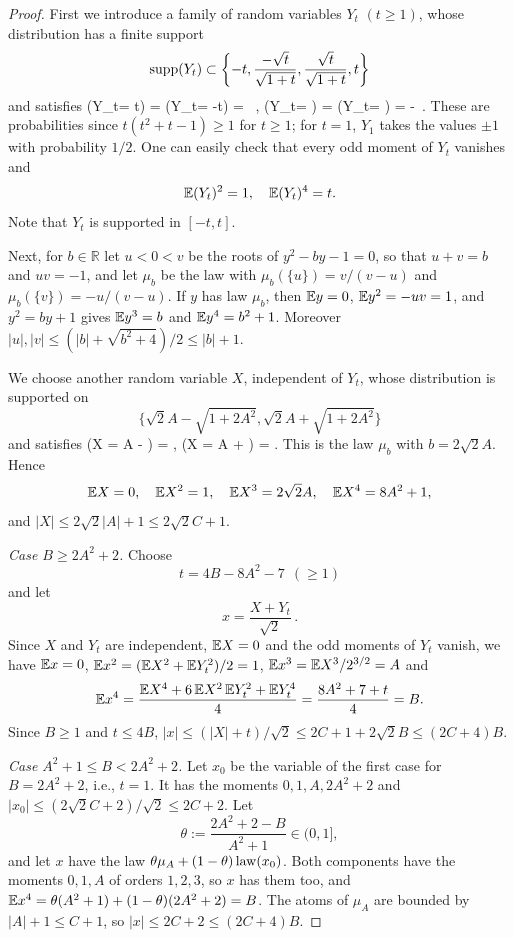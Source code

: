 \begin{proof}
First we introduce a family of random variables $Y_t$ $(t \geq 1)$, whose distribution has a finite support
\begin{equation} \label{defYt}
{\rm supp}(Y_t) \subset \left\{ -t, \frac{-\sqrt{t}}{\sqrt{1+t}}, \frac{\sqrt{t}}{\sqrt{1+t}}, t \right\}
\end {equation}
and satisfies
\be
\p(Y_t= t) = \p(Y_t= -t) =  \, ,
\ee
\be
\p(Y_t= ) = \p(Y_t= ) =  -  \,.
\ee
These are probabilities since $t(t^2+t-1)\ge1$ for $t\ge1$; for $t=1$, $Y_1$ takes the values $\pm1$ with probability $1/2$. One can easily check that every odd moment of $Y_t$ vanishes and
\begin{equation}
\mathbb{E} (Y_t)^2 = 1, \quad \mathbb{E} (Y_t)^4 = t.
\end {equation}
Note that $Y_t$ is supported in $[- t, t]$.

Next, for $b\in\mathbb R$ let $u<0<v$ be the roots of $y^2-by-1=0$, so that $u+v=b$ and $uv=-1$, and let $\mu_b$ be the law with $\mu_b(\{u\})=v/(v-u)$ and $\mu_b(\{v\})=-u/(v-u)$. If $y$ has law $\mu_b$, then $\mathbb{E} y=0$, $\mathbb{E} y^2=-uv=1$, and $y^2=by+1$ gives $\mathbb{E} y^3=b$ and $\mathbb{E} y^4=b^2+1$. Moreover $|u|,|v|\le(|b|+\sqrt{b^2+4})/2\le|b|+1$.

We choose another random variable $X$, independent of $Y_t$, whose distribution is supported on
$$
\{ \sqrt{2}A - \sqrt{1 + 2A^2}, \sqrt{2}A + \sqrt{1 + 2A^2} \}
$$
and satisfies
\be
\p(X = A - ) = ,
\ee
\be
\quad \p(X = A + ) = .
\ee
This is the law $\mu_b$ with $b=2\sqrt2A$. Hence
$$
\mathbb{E} X=0, \quad \mathbb{E} X^2=1, \quad \mathbb{E} X^3=2\sqrt 2A, \quad \mathbb{E} X^4= 8A^2 + 1,
$$
and $|X|\le2\sqrt2|A|+1\le2\sqrt2C+1$.

{\it Case $B\ge2A^2+2$.} Choose
$$
t= 4B-8A^2-7\ \ (\ge1)
$$
and let
$$
x= \frac{X+Y_t}{\sqrt2} \, .
$$
Since $X$ and $Y_t$ are independent, $\mathbb{E} X=0$ and the odd moments of $Y_t$ vanish, we have $\mathbb{E} x=0$, $\mathbb{E} x^2=(\mathbb{E} X^2+\mathbb{E} Y_t^2)/2=1$, $\mathbb{E} x^3=\mathbb{E} X^3/2^{3/2}=A$ and
$$
\mathbb{E} x^4=\frac{\mathbb{E} X^4+6\,\mathbb{E} X^2\,\mathbb{E} Y_t^2+\mathbb{E} Y_t^4}{4}=\frac{8A^2+7+t}{4}=B .
$$
Since $B\ge1$ and $t\le4B$, $|x|\le(|X|+t)/\sqrt2\le2C+1+2\sqrt2B\le(2C+4)B$.

{\it Case $A^2+1\le B<2A^2+2$.} Let $x_0$ be the variable of the first case for $B=2A^2+2$, i.e., $t=1$. It has the moments $0,1,A,2A^2+2$ and $|x_0|\le(2\sqrt2C+2)/\sqrt2\le2C+2$. Let
$$
\theta:=\frac{2A^2+2-B}{A^2+1}\in(0,1],
$$
and let $x$ have the law $\theta\mu_A+(1-\theta)\,{\rm law}(x_0)$. Both components have the moments $0,1,A$ of orders $1,2,3$, so $x$ has them too, and $\mathbb{E} x^4=\theta(A^2+1)+(1-\theta)(2A^2+2)=B$. The atoms of $\mu_A$ are bounded by $|A|+1\le C+1$, so $|x|\le2C+2\le(2C+4)B$.
\end{proof}

